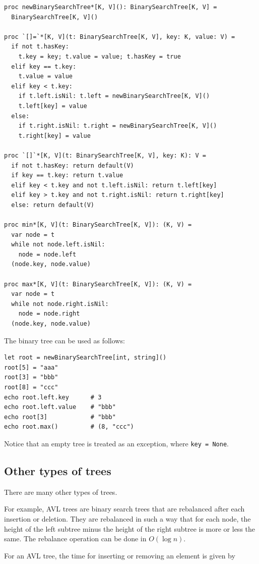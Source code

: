 \documentclass[justified, sixbynine]{tufte-book}
\def\ft{\small\tt}
\theoremstyle{plain}%
\newtheorem * {corollary}{Corollary}
\theoremstyle{definition}
\theoremstyle{remark}
\newtheorem * {remark}{Remark}
\newtheorem * {note}{Note}
\begin{document}
\begin{fullwidth}
\begin{lstlisting}
proc newBinarySearchTree*[K, V](): BinarySearchTree[K, V] =
  BinarySearchTree[K, V]()

proc `[]=`*[K, V](t: BinarySearchTree[K, V], key: K, value: V) =
  if not t.hasKey:
    t.key = key; t.value = value; t.hasKey = true
  elif key == t.key:
    t.value = value
  elif key < t.key:
    if t.left.isNil: t.left = newBinarySearchTree[K, V]()
    t.left[key] = value
  else:
    if t.right.isNil: t.right = newBinarySearchTree[K, V]()
    t.right[key] = value

proc `[]`*[K, V](t: BinarySearchTree[K, V], key: K): V =
  if not t.hasKey: return default(V)
  if key == t.key: return t.value
  elif key < t.key and not t.left.isNil: return t.left[key]
  elif key > t.key and not t.right.isNil: return t.right[key]
  else: return default(V)

proc min*[K, V](t: BinarySearchTree[K, V]): (K, V) =
  var node = t
  while not node.left.isNil:
    node = node.left
  (node.key, node.value)

proc max*[K, V](t: BinarySearchTree[K, V]): (K, V) =
  var node = t
  while not node.right.isNil:
    node = node.right
  (node.key, node.value)
\end{lstlisting}

The binary tree can be used as follows:

\begin{lstlisting}
let root = newBinarySearchTree[int, string]()
root[5] = "aaa"
root[3] = "bbb"
root[8] = "ccc"
echo root.left.key      # 3
echo root.left.value    # "bbb"
echo root[3]            # "bbb"
echo root.max()         # (8, "ccc")
\end{lstlisting}

Notice that an empty tree is treated as an exception, where {\ft key = None}.

\goodbreak\subsection{Other types of trees}

There are many other types of trees. 

For example, AVL trees are binary search trees that are rebalanced after each
insertion or deletion. They are rebalanced in such a way that for each node, the
height of the left subtree minus the height of the right subtree is more or less the same. The rebalance operation can be done in $O(\log n)$.

For an AVL tree, the time for inserting or removing an element is given by


\end{fullwidth}
\end{document}
